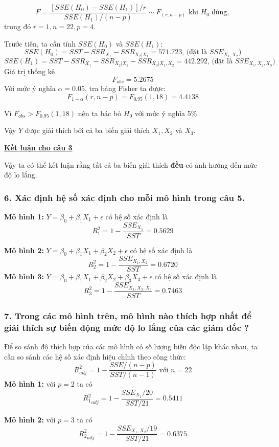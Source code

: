 \documentclass[a4paper]{article}
\theoremstyle{nonumberplain}
\begin{document}
$$F = \displaystyle \frac{\left [ SSE (H_0) - SSE(H_1) \right ] / r}{SSE(H_1)/(n-p)}  \sim F_{(r,n-p)} \text{ khi } H_0 \text{ đúng},$$
trong đó $r = 1, n = 22, p = 4$.

Trước tiên, ta cần tính $SSE (H_0)$ và $SSE(H_1)$:
$$SSE(H_0) = SST - SSR_{X_1} - SSR_{X_2|X_1} = 571.723 \text{, (đặt là }  SSE_{X_1,X_2}) $$
$$SSE(H_1) = SST - SSR_{X_1} - SSR_{X_2|X_1} - SSR_{X_3|X_1,X_2} = 442.292 \text{, (đặt là }  SSE_{X_1,X_2,X_3})$$
Giá trị thống kê $$F_{obs} = 5.2675$$
Với mức ý nghĩa $\alpha = 0.05$, tra bảng Fisher ta được:
$$F_{1-\alpha}(r,n-p) = F_{0.95}(1,18) = 4.4138$$

Vì $F_{obs}>F_{0.95}(1,18)$ nên ta bác bỏ $H_0$ với mức ý nghĩa 5\%.

Vậy $Y$ được giải thích bởi cả ba biến giải thích $X_1, X_2$ và $X_3$.

\textbf{\underline{Kết luận cho câu 3}}

Vậy ta có thể kết luận rằng tất cả ba biến giải thích \textbf{đều} có ảnh hưởng đến mức độ lo lắng.

\subsubsection*{6. Xác định hệ số xác định cho mỗi mô hình trong câu 5.}
\textbf{Mô hình 1:} $Y = \beta_0 + \beta_1 X_1 + \epsilon $ có hệ số xác định là
$$R^2_1 = 1 - \displaystyle \frac{SSE_{X_1}}{SST} = 0.5629$$


\textbf{Mô hình 2:} $Y = \beta_0 + \beta_1 X_1 + \beta_2 X_2 + \epsilon $ có hệ số xác định là
$$R^2_2 = 1 - \displaystyle \frac{SSE_{X_1,X_2}}{SST} = 0.6720$$
\textbf{Mô hình 3:} $Y = \beta_0 + \beta_1 X_1 + \beta_2 X_2 + \beta_3 X_3 + \epsilon $ có hệ số xác định là
$$R^2_3 = 1 - \displaystyle \frac{SSE_{X_1,X_2,X_3}}{SST} = 0.7463$$

\subsubsection*{7. Trong các mô hình trên, mô hình nào thích hợp nhất để giải thích sự biến động mức độ lo lắng của các giám đốc ?}
Để so sánh độ thích hợp của các mô hình có số lượng biến độc lập khác nhau, ta cần so sánh các hệ số xác định hiệu chỉnh theo công thức:
$$R^2_{adj} = 1 - \displaystyle \frac{SSE/(n-p)}{SST/(n-1)} \text{ với } n = 22$$
\textbf{Mô hình 1:} với $p=2$ ta có $${R^2_1}_{adj}  = 1 - \displaystyle \frac{SSE_{X_1}/20}{SST/21} = 0.5411$$ 

\textbf{Mô hình 2:} với $p=3$ ta có $${R^2_2}_{adj} = 1 - \displaystyle \frac{SSE_{X_1,X_2}/19}{SST/21} = 0.6375$$
\end{document}
